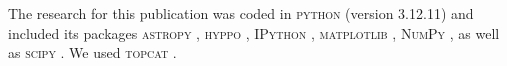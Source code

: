 \documentclass[fleqn,usenatbib]{mnras}
\begin{document}
The research for this publication was coded in \textsc{python} (version 3.12.11) and included its packages
\textsc{astropy} \citep[v. 7.1.0;][]{Robitaille2013,PriceWhelan2018},
\textsc{hyppo} \citep[v. 0.5.2;][]{hyppo},
\textsc{IPython} \citep[v. 9.1.0;][]{ipython},
\textsc{matplotlib} \citep[v. 3.10.3;][]{matplotlib},
\textsc{NumPy} \citep[v. 2.2.6;][]{numpy}, as well as
\textsc{scipy} \citep[v. 1.16.0;][]{Scipy}.
We used \textsc{topcat} \citep[v. 4.7;][]{Taylor2005}.
 




\label{lastpage}
\end{document}
